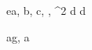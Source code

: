 \begin{eqcode}{e}{a, b, c}{, , ^2}{}
  d \in {} \lend
  d \gets {} \lend %

\end{eqcode}

\begin{eqcode}{a}{g, a }{}{}   
\end{eqcode}
